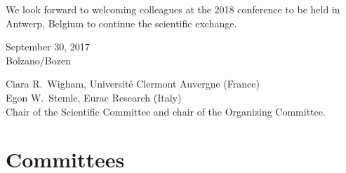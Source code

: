 \documentclass[usegeometry]{scrbook}
\begin{document}
We look forward to welcoming colleagues at the 2018 conference to be held in Antwerp, Belgium to continue the scientific exchange.
\bigskip

\noindent
\begin{minipage}[t]{.18\textwidth}%
    September 30, 2017\\
    Bolzano/Bozen
\end{minipage}%
\hfill
\begin{minipage}[t]{.80\textwidth}\flushright%
    Ciara R.~Wigham, Universit\'e Clermont Auvergne (France)  \\%
    Egon W.~Stemle, Eurac Research (Italy)  \\%
    \medskip
    Chair of the Scientific Committee and chair of the Organizing Committee.
\end{minipage}
\thispagestyle{scrplain}
\clearpage



\renewcommand\contentsname{Table of Contents}
{}
\tableofcontents
\clearpage

\chapter*{Committees}
{}%

\bigskip
\end{document}
